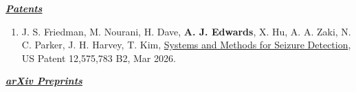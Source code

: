\documentclass[12pt]{article}
\begin{document}
\begin{enumerate}

\end{enumerate}

{\large \textit{\textbf{\ul{Patents}}}}

\begin{enumerate}
\item J. S. Friedman, M. Nourani, H. Dave, \textbf{A. J. Edwards}, X. Hu, A. A. Zaki, N. C. Parker, J. H. Harvey, T. Kim, \ul{Systems and Methods for Seizure Detection}, US Patent 12,575,783 B2, Mar 2026.

\end{enumerate}

{\large \textit{\textbf{\ul{arXiv Preprints}}}}
\end{document}
